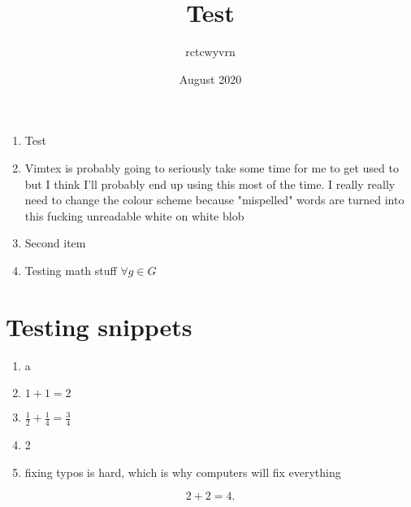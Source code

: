 \documentclass{article}
\title{Test}
\author{rctcwyvrn}
\date{August 2020}
\begin{document}
\maketitle
\begin{enumerate}
	\item Test
	\item Vimtex is probably going to seriously take some time for me to get used to but I think I'll probably end up using this most of the time. I really really need to change the colour scheme because "mispelled" words are turned into this fucking unreadable white on white blob 	
 	\item Second item
	\item Testing math stuff $\forall g\in G$
\end{enumerate}
\section{Testing snippets}
\begin{enumerate}
	\item a
	\item  $1 + 1 = 2$
	\item $\frac{1}{2} + \frac{1}{4} = \frac{3}{4}$
	\item 2
	\item fixing typos is hard, which is why computers will fix everything
\end{enumerate}
\[
2 + 2 = 4
.\] 
\end{document}
